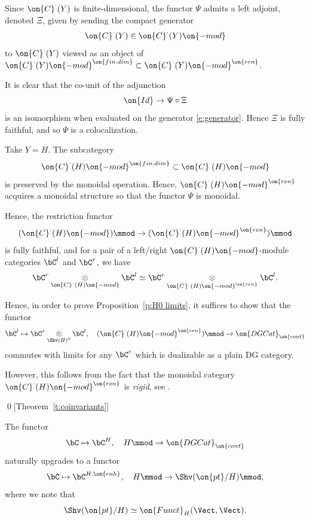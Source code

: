 \documentclass[9pt]{amsart}
\theoremstyle{definition}
\theoremstyle{remark}
\newcommand{\thmref}[1]{Theorem~\ref{#1}}
\newcommand{\propref}[1]{Proposition~\ref{#1}}
\numberwithin{equation}{section}
\renewcommand{\mod}{{\on{-mod}}}
\begin{document}
Since $\on{C}^\cdot(Y)$ is finite-dimensional, the functor $\Psi$ admits a left adjoint, denoted $\Xi$, given by sending 
the compact generator
\begin{equation} \label{e:generator}
\on{C}^\cdot(Y)\in \on{C}^\cdot(Y)\mod
\end{equation} 
to $\on{C}^\cdot(Y)$ viewed as an object of $\on{C}^\cdot(Y)\mod^{\on{fin.dim}}\subset \on{C}^\cdot(Y)\mod^{\on{ren}}$.

\medskip

It is clear that the co-unit of the adjunction
$$\on{Id}\to \Psi\circ \Xi$$
is an isomorphism when evaluated on the generator \eqref{e:generator}. Hence $\Xi$ is fully faithful, and so 
$\Psi$ is a colocalization. 

\sssec{}

Take $Y=H$. The subcategory 
$$\on{C}^\cdot(H)\mod^{\on{fin.dim}}\subset \on{C}^\cdot(H)\mod$$
is preserved by the monoidal operation. Hence, 
$\on{C}^\cdot(H)\mod^{\on{ren}}$ acquires a monoidal structure so that the functor $\Psi$ is monoidal.

\medskip

Hence, the restriction functor
$$(\on{C}^\cdot(H)\mod)\mmod \to (\on{C}^\cdot(H)\mod^{\on{ren}})\mmod$$
is fully faithful, and for a pair of a left/right $\on{C}^\cdot(H)\mod$-module categories
$\bC^l$ and $\bC^r$, we have 
$$\bC^r\underset{\on{C}^\cdot(H)\mod}\otimes \bC^l\simeq \bC^r\underset{\on{C}^\cdot(H)\mod^{\on{ren}}}\otimes \bC^l.$$

\sssec{}

Hence, in order to prove \propref{p:H0 limits}, it suffices to show that the functor
$$\bC^l\mapsto \bC^r\underset{\Shv(H)^0}\otimes \bC^l, \quad (\on{C}^\cdot(H)\mod^{\on{ren}})\mmod
\to \on{DGCat}_{\on{cont}}$$
commutes with limits for any $\bC^r$ which is dualizable as a plain DG category.

\medskip

However, this follows from the fact that the monoidal category $\on{C}^\cdot(H)\mod^{\on{ren}}$ is 
\emph{rigid}, see  \cite[Chapter 1, Prop. 9.5.3]{GR1}.  

\qed[\thmref{t:coinvariants}]


\sssec{}

The functor
$$\bC\mapsto \bC^H, \quad H\mmod\to \on{DGCat}_{\on{cont}}$$
naturally upgrades to a functor
\begin{equation} \label{e:inv enh}
\bC\mapsto \bC^{H,\on{enh}},\quad H\mmod\to \Shv(\on{pt}/H)\mmod,
\end{equation}
where we note that
$$\Shv(\on{pt}/H)\simeq \on{Funct}_H(\Vect,\Vect).$$
\end{document}

